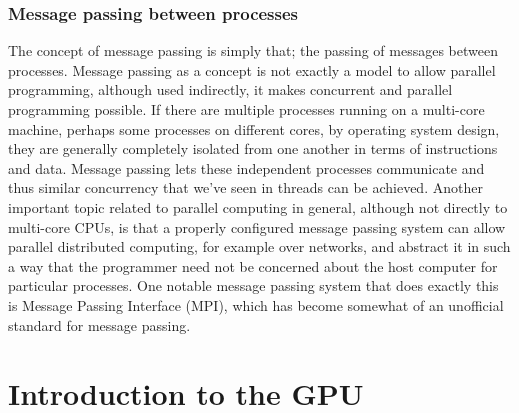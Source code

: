 \documentclass[a4paper,11pt]{article}
\begin{document}
\subsubsection{Message passing between processes} %
\label{ssub:message_passing_between_processes}
The concept of message passing is simply that; the passing of messages between processes. Message passing as a concept is
not exactly a model to allow parallel programming, although used indirectly, it makes concurrent and parallel programming
possible. If there are multiple processes running on a multi-core machine, perhaps some processes on different cores, by
operating system design, they are generally completely isolated from one another in terms of instructions and data. Message
passing lets these independent processes communicate and thus similar concurrency that we've seen in threads can be achieved.
Another important topic related to parallel computing in general, although not directly to multi-core CPUs, is that a
properly configured message passing system can allow parallel distributed computing, for example over networks, and abstract
it in such a way that the programmer need not be concerned about the host computer for particular processes. One notable
message passing system that does exactly this is Message Passing Interface (MPI), which has become somewhat of an unofficial
standard for message passing.





\section{Introduction to the GPU} %
\label{sec:introduction_to_the_gpu}
\end{document}
